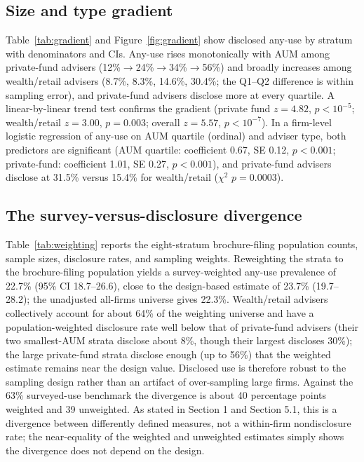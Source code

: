 \documentclass[utf8]{FrontiersinHarvard}
\begin{document}
\subsection{Size and type gradient}
Table~\ref{tab:gradient} and Figure~\ref{fig:gradient} show disclosed any-use by stratum with denominators and CIs. Any-use rises monotonically with AUM among private-fund advisers (12\%$\rightarrow$24\%$\rightarrow$34\%$\rightarrow$56\%) and broadly increases among wealth/retail advisers (8.7\%, 8.3\%, 14.6\%, 30.4\%; the Q1--Q2 difference is within sampling error), and private-fund advisers disclose more at every quartile. A linear-by-linear trend test confirms the gradient (private fund $z = 4.82$, $p < 10^{-5}$; wealth/retail $z = 3.00$, $p = 0.003$; overall $z = 5.57$, $p < 10^{-7}$). In a firm-level logistic regression of any-use on AUM quartile (ordinal) and adviser type, both predictors are significant (AUM quartile: coefficient 0.67, SE 0.12, $p < 0.001$; private-fund: coefficient 1.01, SE 0.27, $p < 0.001$), and private-fund advisers disclose at 31.5\% versus 15.4\% for wealth/retail ($\chi^2$ $p = 0.0003$).

\subsection{The survey-versus-disclosure divergence}
Table~\ref{tab:weighting} reports the eight-stratum brochure-filing population counts, sample sizes, disclosure rates, and sampling weights. Reweighting the strata to the brochure-filing population yields a survey-weighted any-use prevalence of 22.7\% (95\% CI 18.7--26.6), close to the design-based estimate of 23.7\% (19.7--28.2); the unadjusted all-firms universe gives 22.3\%. Wealth/retail advisers collectively account for about 64\% of the weighting universe and have a population-weighted disclosure rate well below that of private-fund advisers (their two smallest-AUM strata disclose about 8\%, though their largest discloses 30\%); the large private-fund strata disclose enough (up to 56\%) that the weighted estimate remains near the design value. Disclosed use is therefore robust to the sampling design rather than an artifact of over-sampling large firms. Against the 63\% surveyed-use benchmark the divergence is about 40 percentage points weighted and 39 unweighted. As stated in Section 1 and Section 5.1, this is a divergence between differently defined measures, not a within-firm nondisclosure rate; the near-equality of the weighted and unweighted estimates simply shows the divergence does not depend on the design.
\end{document}
